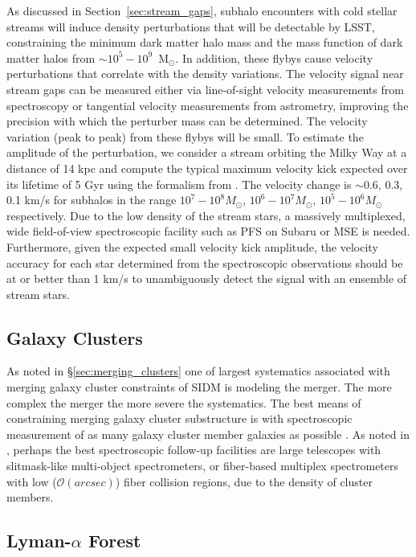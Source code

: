 As discussed in Section~\ref{sec:stream_gaps}, subhalo encounters with cold stellar streams will induce density perturbations that will be detectable by LSST, constraining the minimum dark matter halo mass and the mass function of dark matter halos from $\sim10^{5} - 10^{9}$~M$_{\odot}$. In addition, these flybys cause velocity perturbations that correlate with the density variations.  The velocity signal near stream gaps can be measured either via line-of-sight velocity measurements from spectroscopy or tangential velocity measurements from astrometry, improving the precision with which the perturber mass can be determined.
The velocity variation (peak to peak) from these flybys will be small. To estimate the amplitude of the perturbation, we consider a stream orbiting the Milky Way at a distance of 14 kpc and compute the typical maximum velocity kick expected over its lifetime of 5 Gyr using the formalism from \cite{erkal2016}.  The velocity change is $\sim$0.6, 0.3, 0.1 km/s for subhalos in the range $10^7-10^8 M_\odot$, $10^6-10^7 M_\odot$, $10^5 -10^6 M_\odot$ respectively. Due to the low density of the stream stars, a massively multiplexed, wide field-of-view spectroscopic facility such as PFS on Subaru or MSE is needed. Furthermore, given the expected small velocity kick amplitude, the velocity accuracy for each star determined from the spectroscopic observations should be at or better than 1 km/s to unambiguously detect the signal with an ensemble of stream stars.

\subsection{Galaxy Clusters }
As noted in \S\ref{sec:merging_clusters} one of largest systematics associated with merging galaxy cluster constraints of SIDM is modeling the merger. The more complex the merger the more severe the systematics.
The best means of constraining merging galaxy cluster substructure is with spectroscopic measurement of as many galaxy cluster member galaxies as possible \cite[see e.g.,][]{2018arXiv180610619G}.
As noted in \cite{2016arXiv161001661N}, perhaps the best spectroscopic follow-up facilities are large telescopes with slitmask-like multi-object spectrometers, or fiber-based multiplex spectrometers with low ($\mathcal{O}(arcsec)$) fiber collision regions, due to the density of cluster members.


\subsection{Lyman-$\alpha$ Forest }

